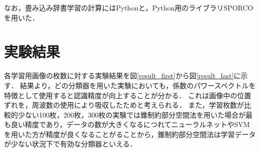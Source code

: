 なお，畳み込み辞書学習の計算にはPythonと，Python用のライブラリSPORCO\cite{sporco}を用いた．

\section{実験結果}
各学習用画像の枚数に対する実験結果を図\ref{result_first}から図\ref{result_last}に示す．
結果より，どの分類器を用いた実験においても，係数のパワースペクトルを特徴として使用すると認識精度が向上することが分かる．
これは画像中の位置ずれを，周波数の使用により吸収したためと考えられる．
また，学習枚数が比較的少ない100枚，200枚，300枚の実験では錐制約部分空間法を用いた場合が最も良い精度であり，データの数が大きくなるにつれてニューラルネットやSVMを用いた方が精度が良くなることがることから，錐制約部分空間法は学習データが少ない状況下で有効な分類器といえる．

